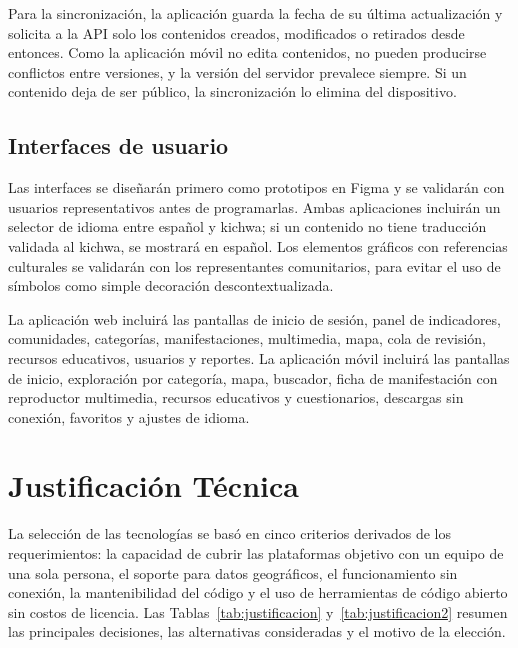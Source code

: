 Para la sincronización, la aplicación guarda la fecha de su última actualización y solicita a la API solo los contenidos creados, modificados o retirados desde entonces. Como la aplicación móvil no edita contenidos, no pueden producirse conflictos entre versiones, y la versión del servidor prevalece siempre. Si un contenido deja de ser público, la sincronización lo elimina del dispositivo.

\subsection{Interfaces de usuario}
Las interfaces se diseñarán primero como prototipos en Figma y se validarán con usuarios representativos antes de programarlas. Ambas aplicaciones incluirán un selector de idioma entre español y kichwa; si un contenido no tiene traducción validada al kichwa, se mostrará en español. Los elementos gráficos con referencias culturales se validarán con los representantes comunitarios, para evitar el uso de símbolos como simple decoración descontextualizada.

La aplicación web incluirá las pantallas de inicio de sesión, panel de indicadores, comunidades, categorías, manifestaciones, multimedia, mapa, cola de revisión, recursos educativos, usuarios y reportes. La aplicación móvil incluirá las pantallas de inicio, exploración por categoría, mapa, buscador, ficha de manifestación con reproductor multimedia, recursos educativos y cuestionarios, descargas sin conexión, favoritos y ajustes de idioma.

\section{Justificación Técnica}
La selección de las tecnologías se basó en cinco criterios derivados de los requerimientos: la capacidad de cubrir las plataformas objetivo con un equipo de una sola persona, el soporte para datos geográficos, el funcionamiento sin conexión, la mantenibilidad del código y el uso de herramientas de código abierto sin costos de licencia. Las Tablas~\ref{tab:justificacion} y~\ref{tab:justificacion2} resumen las principales decisiones, las alternativas consideradas y el motivo de la elección.

